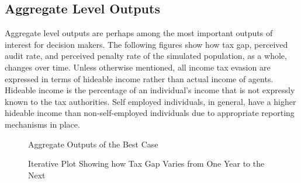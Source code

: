 \documentclass{article}
\begin{document}
\subsection{Aggregate Level Outputs}
Aggregate level outputs are perhaps among the most important outputs of interest for decision makers. The following figures show how tax gap, perceived audit rate, and perceived penalty rate of the simulated population, as a whole, changes over time. Unless otherwise mentioned, all income tax evasion are expressed in terms of hideable income rather than actual income of agents. Hideable income is the percentage of an individual's income that is not expressly known to the tax authorities. Self employed individuals, in general, have a higher hideable income than non-self-employed individuals due to appropriate reporting mechanisms in place. 
  \begin{figure}[ht]
		\caption{Aggregate Outputs of the Best Case}
	\end{figure}
	
	\begin{figure}[ht]
		\caption{Iterative Plot Showing how Tax Gap Varies from One Year to the Next}
	\end{figure}
\end{document}
